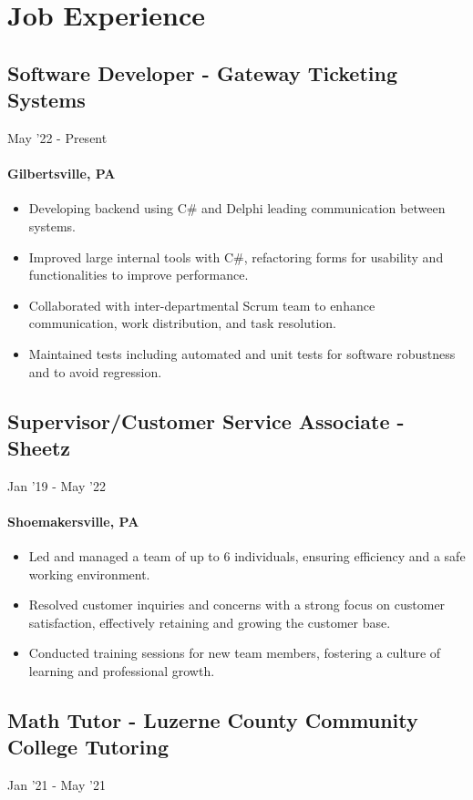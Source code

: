 \documentclass{article}
\begin{document}
\section{Job Experience}
\subsection{Software Developer - Gateway Ticketing Systems} \hfill May '22 - Present
\paragraph{Gilbertsville, PA}

\begin{itemize}
  \itemsep0em 
  \item Developing backend using C\# and Delphi leading communication between systems.
  \item Improved large internal tools with C\#, refactoring forms for usability and functionalities to improve performance.
  \item Collaborated with inter-departmental Scrum team to enhance communication, work distribution, and task resolution.
  \item Maintained tests including automated and unit tests for software robustness and to avoid regression.
\end{itemize}

\subsection{Supervisor/Customer Service Associate - Sheetz} \hfill Jan '19 - May '22
\paragraph{Shoemakersville, PA}
\begin{itemize}
  \itemsep0em 
  \item Led and managed a team of up to 6 individuals, ensuring efficiency and a safe working environment.
  \item Resolved customer inquiries and concerns with a strong focus on customer satisfaction, effectively retaining and growing the customer base.
  \item Conducted training sessions for new team members, fostering a culture of learning and professional growth.
\end{itemize}

\subsection{Math Tutor - Luzerne County Community College Tutoring} \hfill Jan '21 - May '21
\end{document}
